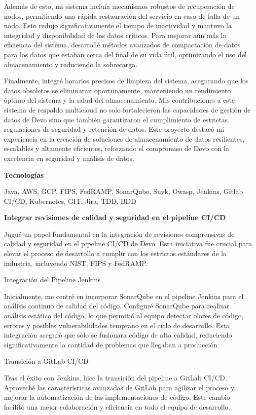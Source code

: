 \documentclass[a4paper,10pt]{article}
\newcommand{\cvsubsubsection}[1]{
\begin{tcolorbox}[colback=gray!10, colframe=gray!10, boxrule=0pt, arc=0mm, outer arc=0mm, width=\textwidth, boxsep=0pt, left=4mm, right=4mm, top=1mm, bottom=1mm]
  \textbf{#1}
\end{tcolorbox}
\vspace{1mm}
}
\newcommand{\cvsubsubsubsection}[1]{
  \begin{tcolorbox}[colback=gray!5, colframe=gray!5, boxrule=0pt, arc=0mm, outer arc=0mm, width=\textwidth, boxsep=0pt, left=6mm, right=6mm, top=1mm, bottom=1mm]
    \textbf{#1}
  \end{tcolorbox}
  \vspace{1mm}
}
\begin{document}
Además de esto, mi sistema incluía mecanismos robustos de recuperación de nodos, permitiendo una rápida restauración del servicio en caso de falla de un nodo. Esto redujo significativamente el tiempo de inactividad y mantuvo la integridad y disponibilidad de los datos críticos. Para mejorar aún más la eficiencia del sistema, desarrollé métodos avanzados de compactación de datos para los datos que estaban cerca del final de su vida útil, optimizando el uso del almacenamiento y reduciendo la sobrecarga.

Finalmente, integré horarios precisos de limpieza del sistema, asegurando que los datos obsoletos se eliminaran oportunamente, manteniendo un rendimiento óptimo del sistema y la salud del almacenamiento. Mis contribuciones a este sistema de respaldo multicloud no solo fortalecieron las capacidades de gestión de datos de Devo sino que también garantizaron el cumplimiento de estrictas regulaciones de seguridad y retención de datos. Este proyecto destacó mi experiencia en la creación de soluciones de almacenamiento de datos resilientes, escalables y altamente eficientes, reforzando el compromiso de Devo con la excelencia en seguridad y análisis de datos.

\cvsubsubsubsection{Tecnologías}
Java, AWS, GCP, FIPS, FedRAMP, SonarQube, Snyk, Owasp, Jenkins, Gitlab CI/CD, Kubernetes, GIT, Jira, TDD, BDD

\cvsubsubsection{Integrar revisiones de calidad y seguridad en el pipeline CI/CD}
Jugué un papel fundamental en la integración de revisiones comprensivas de calidad y seguridad en el pipeline CI/CD de Devo. Esta iniciativa fue crucial para elevar el proceso de desarrollo a cumplir con los estrictos estándares de la industria, incluyendo NIST, FIPS y FedRAMP.

Integración del Pipeline Jenkins

Inicialmente, me centré en incorporar SonarQube en el pipeline Jenkins para el análisis continuo de calidad del código. Configuré SonarQube para realizar análisis estático del código, lo que permitió al equipo detectar olores de código, errores y posibles vulnerabilidades temprano en el ciclo de desarrollo. Esta integración aseguró que solo se fusionara código de alta calidad, reduciendo significativamente la cantidad de problemas que llegaban a producción.

Transición a GitLab CI/CD

Tras el éxito con Jenkins, hice la transición del pipeline a GitLab CI/CD. Aproveché las características avanzadas de GitLab para agilizar el proceso y mejorar la automatización de las implementaciones de código. Este cambio facilitó una mejor colaboración y eficiencia en todo el equipo de desarrollo.
\end{document}
